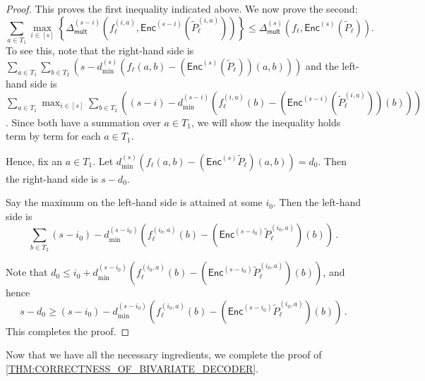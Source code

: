 \documentclass{theoretics}
\def\Natural{\mathbb{N}}
\def\Field{\mathbb{F}}
\let\N\Natural
\let\F\Field
\renewcommand{\tilde}[1]{\widetilde{#1}}
\newcommand{\enc}{{\mathsf{Enc}}}
\newcommand{\encs}{{\mathsf{Enc}^{(s)}}}
\newcommand{\Delm}{\Delta_{\mathsf{mult}}}
\begin{document}
\begin{proof}
		This proves the first inequality indicated above. We now prove the second:
		\[ 
		\sum_{a \in T_1} \max_{i \in [s]} \left\{\Delm^{(s-i)} \left(f_{\ell}^{(i,a)}, \enc^{(s-i)}\left(\tilde{P}_{\ell}^{(i,a)}\right)\right)  \right\} \leq \Delm^{(s)} \left(f_\ell, \encs\left( \tilde{P}_\ell\right)\right).
		\]
		To see this, note that the right-hand side is $\sum_{a \in T_1} \sum_{b \in T_2} \left(s-d_{\min}^{(s)}\left(f_\ell(a, b)-\left(\enc^{(s)}\left(\tilde{P}_\ell\right)\right)\left(a, b\right)\right)\right)$ and the left-hand side is $\sum_{a \in T_1} \max_{i \in [s]} \sum_{b \in
			T_2} \left((s-i) - d_{\min}^{(s-i)} \left(f_{\ell}^{(i,a)}(b) - \left(\enc^{(s-i)}\left(\tilde{P}_{\ell}^{(i,a)}\right)\right)\left(b\right)\right)\right)$. Since both
		have a summation over $a \in T_1$, we will show the inequality holds
		term by term for each $a \in T_1$. 
		
		Hence, fix an $a \in T_1$. Let $d_{\min}^{(s)}\left(f_\ell(a, b) -
		\left(\enc^{(s)} \tilde{P}_\ell\right)\left(a, b\right)\right) = d_0$. Then the right-hand side is $s-d_0$.
		
		Say the maximum on the left-hand side is
		attained at some $i_0$. Then the
		left-hand side is \[\sum_{b \in T_2} (s-i_0) -
		d_{\min}^{(s-i_0)}\left(f_{\ell}^{(i_0, a)}(b) - \left(\enc^{(s-i_0)}\tilde{P}_{\ell}^{(i_0,
			a)}\right)(b)\right)\,.\] 
		
		Note that $d_0\leq i_0 +
		d_{\min}^{(s-i_0)}\left(f_\ell^{(i_0, a)}(b) - \left(\enc^{(s-i_0)}\tilde{P}_\ell^{(i_0,
			a)}\right)(b)\right)$, and hence \[s-d_0 \geq (s-i_0) -
		d_{\min}^{(s-i_0)}\left(f_\ell^{(i_0, a)}(b) - \left(\enc^{(s-i_0)}\tilde{P}_\ell^{(i_0,
			a)}\right)(b)\right)\,.\] 
		This completes the proof. \qedhere
	\end{proof}
	
	Now that we have all the necessary ingredients, we complete the proof
	of \cref{THM:CORRECTNESS_OF_BIVARIATE_DECODER}.
	
		
\end{document}

